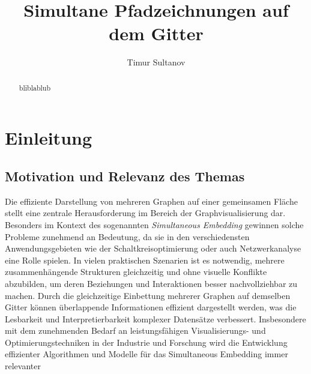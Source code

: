 \documentclass[bachelor, german]{algothesis}
\title{Simultane Pfadzeichnungen auf dem Gitter} %
\author{Timur Sultanov} %
\begin{document}
\begin{abstract}
bliblablub
\end{abstract}

\thesistableofcontents

\chapter{Einleitung}
\section{Motivation und Relevanz des Themas}
Die effiziente Darstellung von mehreren Graphen auf einer gemeinsamen Fläche stellt eine zentrale Herausforderung im Bereich der Graphvisualisierung dar. Besonders im Kontext des sogenannten \textit{Simultaneous Embedding} gewinnen solche Probleme zunehmend an Bedeutung, da sie in den verschiedensten Anwendungsgebieten wie der Schaltkreisoptimierung oder auch Netzwerkanalyse eine Rolle spielen. In vielen praktischen Szenarien ist es notwendig, mehrere zusammenhängende Strukturen gleichzeitig und ohne visuelle Konflikte abzubilden, um deren Beziehungen und Interaktionen besser nachvollziehbar zu machen.\newline
Durch die gleichzeitige Einbettung mehrerer Graphen auf demselben Gitter können überlappende Informationen effizient dargestellt werden, was die Lesbarkeit und Interpretierbarkeit komplexer Datensätze verbessert.  Insbesondere mit dem zunehmenden Bedarf an leistungsfähigen Visualisierungs- und Optimierungstechniken in der Industrie und Forschung wird die Entwicklung effizienter Algorithmen und Modelle für das Simultaneous Embedding immer relevanter
\end{document}
